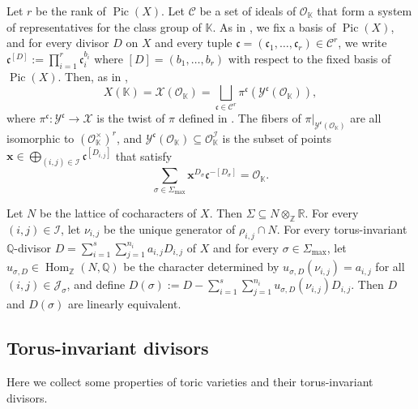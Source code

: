 \documentclass[10pt, a4paper, reqno, english]{amsart}
\newcommand\ZZ{\mathbb{Z}}
\newcommand\RR{\mathbb{R}}
\newcommand\QQ{\mathbb{Q}}
\newcommand{\KK}{\mathbb{K}} %
\newcommand{\OO}{\mathcal{O}} %
\newcommand{\ii}[1]{\mathcal{J}_{#1}} %
\newcommand{\gen}[1]{\nu_{#1}} %
\newcommand{\indexset}{{\mathcal I}} %
\DeclareMathOperator{\pic}{Pic} %
\DeclareMathOperator{\Hom}{Hom} %
\theoremstyle{definition}
\numberwithin{theorem}{section}
\numberwithin{equation}{section}
\begin{document}
	Let $r$ be the rank of $\pic(X)$.
	Let $\mathcal{C}$ be a set of ideals of $\OO_{\KK}$ that form a system of representatives 
	for the class group of $\KK$. 
	As in \cite[\S 6.1]{hypmethod}, we fix a basis of $\pic(X)$, and
	for every divisor $D$ on $X$ and every tuple $\mathfrak c=(\mathfrak c_1,\dots,\mathfrak c_r)\in\mathcal C^r$,
	we write $\mathfrak c^{[D]}:=\prod_{i=1}^r \mathfrak c_i^{b_i}$ where 
	$[D]=(b_1,\dots,b_r)$  with respect to the fixed basis of $\pic(X)$.
	Then, as in \cite[\S2]{MR3514738},
 	\[
 	X(\KK)=\mathscr X(\OO_{\KK})=
 	\bigsqcup_{\mathfrak c\in\mathcal C^{r}}\pi^{\mathfrak c}
 	\left(\mathscr{Y}^{\mathfrak c}(\OO_{\KK})\right),
 	\]
 	where  $\pi^{\mathfrak c}:\mathscr{Y}^{\mathfrak c}\to\mathscr X$ is the twist 
 	of $\pi$ defined in \cite[Theorem 2.7]{MR3552013}.
 	The fibers of $\pi|_{\mathscr{Y}^{\mathfrak c}(\OO_{\KK})}$ are all isomorphic to 
 	$(\OO_{\KK}^\times)^{r}$, and
	$\mathscr{Y}^{\mathfrak c}(\OO_{\KK})\subseteq \OO_{\KK}^{\indexset}$ is the subset of 
	points $\mathbf x\in \bigoplus_{(i,j)\in\indexset}\mathfrak c^{[D_{i,j}]}$ that satisfy
	\begin{equation}
	\label{eq:coprimality_condition}
	\sum_{\sigma\in\Sigma_{\max}}\mathbf x^{D_\sigma}\mathfrak c^{-[D_\sigma]}=\OO_{\KK}.
	\end{equation}

	Let $N$ be the lattice of cocharacters of $X$. Then $\Sigma\subseteq N\otimes_\ZZ\RR$.
	For every $(i,j)\in\indexset$, let $\gen{i,j}$ be the unique generator of $\rho_{i,j}\cap N$.
	For every torus-invariant $\QQ$-divisor $D=\sum_{i=1}^s\sum_{j=1}^{n_i} a_{i,j} D_{i,j}$ of $X$ and for every 
	$\sigma\in\Sigma_{\max}$, let $u_{\sigma,D}\in\Hom_{\ZZ}(N,\QQ)$ be the character determined by 
	$u_{\sigma,D}(\gen{i,j})=a_{i,j}$ for all $(i,j)\in\ii{\sigma}$, and define 
	$D(\sigma):=D-\sum_{i=1}^s\sum_{j=1}^{n_i}u_{\sigma,D}(\gen{i,j})D_{i,j}$. 
	Then $D$ and $D(\sigma)$ are linearly equivalent.
	
\subsection{Torus-invariant divisors}

	Here we collect some properties of toric varieties and their torus-invariant divisors.
\end{document}
